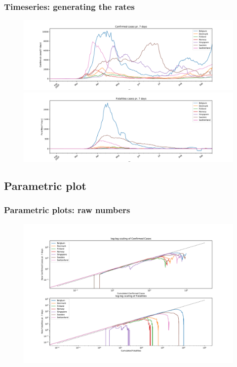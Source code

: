 \documentclass{beamer}
\begin{document}
\begin{frame}
\frametitle{Timeseries: generating the rates}
\begin{figure}[H]
\includegraphics[width=\textwidth]{../figs/confirmed_rate_timeseries_7days_linear.pdf}
\includegraphics[width=\textwidth]{../figs/deaths_rate_timeseries_7days_linear.pdf}
\end{figure}
\end{frame}

\subsection{Parametric plot}
\begin{frame}
\frametitle{Parametric plots: raw numbers}
\begin{figure}[H]
\includegraphics[width=\textwidth]{../figs/parametric_plots_log.pdf}
\end{figure}
\end{frame}
\end{document}
